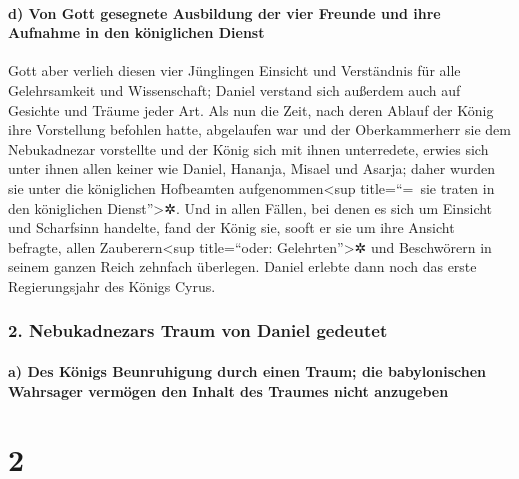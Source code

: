 \hypertarget{d-von-gott-gesegnete-ausbildung-der-vier-freunde-und-ihre-aufnahme-in-den-kuxf6niglichen-dienst}{%
\paragraph{d) Von Gott gesegnete Ausbildung der vier Freunde und ihre
Aufnahme in den königlichen
Dienst}\label{d-von-gott-gesegnete-ausbildung-der-vier-freunde-und-ihre-aufnahme-in-den-kuxf6niglichen-dienst}}

Gott aber verlieh diesen vier Jünglingen Einsicht und
Verständnis für alle Gelehrsamkeit und Wissenschaft; Daniel verstand
sich außerdem auch auf Gesichte und Träume jeder Art. Als
nun die Zeit, nach deren Ablauf der König ihre Vorstellung befohlen
hatte, abgelaufen war und der Oberkammerherr sie dem Nebukadnezar
vorstellte und der König sich mit ihnen unterredete,
erwies sich unter ihnen allen keiner wie Daniel, Hananja, Misael und
Asarja; daher wurden sie unter die königlichen Hofbeamten
aufgenommen\textless sup title=``=~sie traten in den königlichen
Dienst''\textgreater✲. Und in allen Fällen, bei denen es
sich um Einsicht und Scharfsinn handelte, fand der König sie, sooft er
sie um ihre Ansicht befragte, allen Zauberern\textless sup title=``oder:
Gelehrten''\textgreater✲ und Beschwörern in seinem ganzen Reich zehnfach
überlegen. Daniel erlebte dann noch das erste
Regierungsjahr des Königs Cyrus.

\hypertarget{nebukadnezars-traum-von-daniel-gedeutet}{%
\subsubsection{2. Nebukadnezars Traum von Daniel
gedeutet}\label{nebukadnezars-traum-von-daniel-gedeutet}}

\hypertarget{a-des-kuxf6nigs-beunruhigung-durch-einen-traum-die-babylonischen-wahrsager-vermuxf6gen-den-inhalt-des-traumes-nicht-anzugeben}{%
\paragraph{a) Des Königs Beunruhigung durch einen Traum; die
babylonischen Wahrsager vermögen den Inhalt des Traumes nicht
anzugeben}\label{a-des-kuxf6nigs-beunruhigung-durch-einen-traum-die-babylonischen-wahrsager-vermuxf6gen-den-inhalt-des-traumes-nicht-anzugeben}}

\hypertarget{section-1}{%
\section{2}\label{section-1}}


